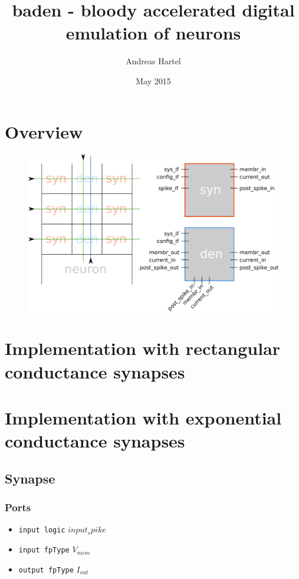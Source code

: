 \documentclass[a4paper]{report}
\begin{document}
\title{baden - bloody accelerated digital emulation of neurons}
\author{Andreas Hartel}
\date{May 2015}
\maketitle

\chapter{Overview}
\begin{figure}
\includegraphics[scale=.6]{overview.png}
\end{figure}

\chapter{Implementation with rectangular conductance synapses}

\chapter{Implementation with exponential conductance synapses}
\section{Synapse}
\subsection{Ports}
	\begin{itemize}
		\item \texttt{input logic} $input_spike$
		\item \texttt{input fpType} $V_{mem}$
		\item \texttt{output fpType} $I_{out}$
	\end{itemize}
\end{document}

